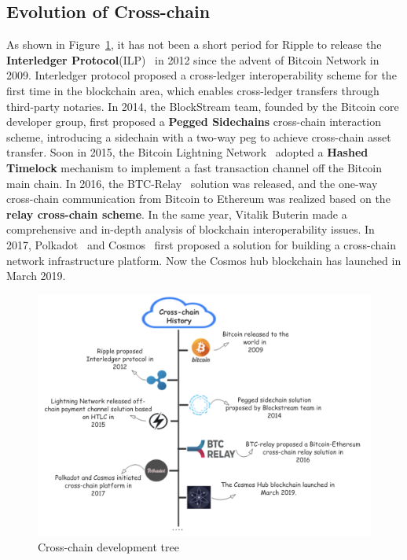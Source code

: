\subsection{Evolution of Cross-chain}
\noindent As shown in Figure~\ref{fig:his}, it has not been a short period for Ripple to release the \textbf{Interledger Protocol}(ILP)~\cite{thomas2015protocol} in 2012 since the advent of Bitcoin Network in 2009. Interledger protocol proposed a cross-ledger interoperability scheme for the first time in the blockchain area, which enables cross-ledger transfers through third-party notaries. In 2014, the BlockStream team, founded by the Bitcoin core developer group, first proposed a \textbf{Pegged Sidechains} cross-chain interaction scheme, introducing a sidechain with a two-way peg to achieve cross-chain asset transfer. Soon in 2015, the Bitcoin Lightning Network~\cite{poon2016bitcoin} adopted a \textbf{Hashed Timelock} mechanism to implement a fast transaction channel off the Bitcoin main chain. In 2016, the BTC-Relay~\cite{btc-relay} solution was released, and the one-way cross-chain communication from Bitcoin to Ethereum was realized based on the \textbf{relay cross-chain scheme}. In the same year, Vitalik Buterin made a comprehensive and in-depth analysis of blockchain interoperability issues. In 2017, Polkadot~\cite{polkadot} and Cosmos~\cite{cosmos} first proposed a solution for building a cross-chain network infrastructure platform. Now the Cosmos hub blockchain has launched in March 2019.

    \begin{figure}[H]
    \includegraphics[width=1\textwidth]{./figures/his.png}
    \centering
    \caption{Cross-chain development tree}%
    \centering
    \label{fig:his}
    \end{figure}
    
